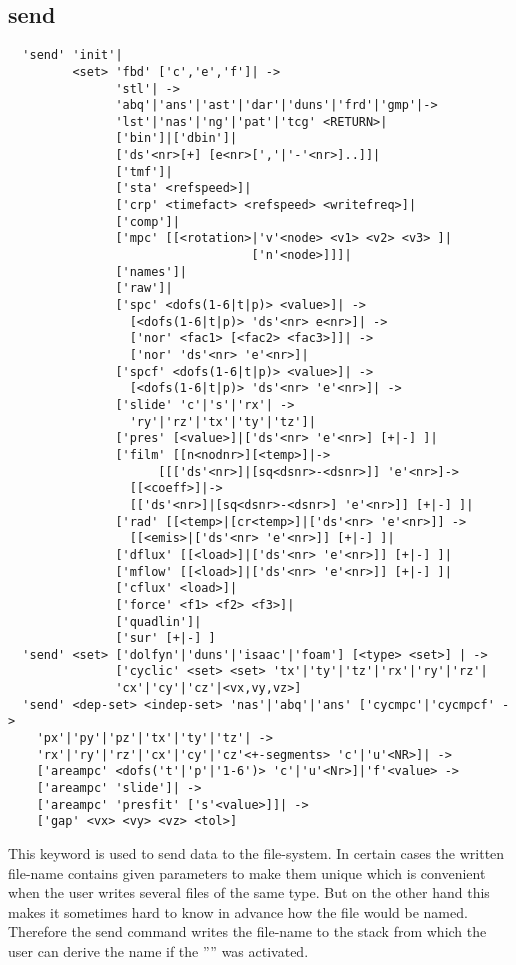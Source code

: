 \documentclass{article}
\begin{document}
\subsection{\label{send}send}
\begin{verbatim}
  'send' 'init'|
         <set> 'fbd' ['c','e','f']| ->
               'stl'| ->
               'abq'|'ans'|'ast'|'dar'|'duns'|'frd'|'gmp'|->
               'lst'|'nas'|'ng'|'pat'|'tcg' <RETURN>|
               ['bin']|['dbin']|
               ['ds'<nr>[+] [e<nr>[','|'-'<nr>]..]]|
               ['tmf']|
               ['sta' <refspeed>]|
               ['crp' <timefact> <refspeed> <writefreq>]|
               ['comp']|
               ['mpc' [[<rotation>|'v'<node> <v1> <v2> <v3> ]|
                                  ['n'<node>]]]|
               ['names']|
               ['raw']|
               ['spc' <dofs(1-6|t|p)> <value>]| ->
                 [<dofs(1-6|t|p)> 'ds'<nr> e<nr>]| ->
                 ['nor' <fac1> [<fac2> <fac3>]]| ->
                 ['nor' 'ds'<nr> 'e'<nr>]|
               ['spcf' <dofs(1-6|t|p)> <value>]| ->
                 [<dofs(1-6|t|p)> 'ds'<nr> 'e'<nr>]| ->
               ['slide' 'c'|'s'|'rx'| ->
                 'ry'|'rz'|'tx'|'ty'|'tz']|
               ['pres' [<value>]|['ds'<nr> 'e'<nr>] [+|-] ]|
               ['film' [[n<nodnr>][<temp>]|->
                     [[['ds'<nr>]|[sq<dsnr>-<dsnr>]] 'e'<nr>]->
                 [[<coeff>]|->
                 [['ds'<nr>]|[sq<dsnr>-<dsnr>] 'e'<nr>]] [+|-] ]| 
               ['rad' [[<temp>|[cr<temp>]|['ds'<nr> 'e'<nr>]] ->
                 [[<emis>|['ds'<nr> 'e'<nr>]] [+|-] ]|
               ['dflux' [[<load>]|['ds'<nr> 'e'<nr>]] [+|-] ]|
               ['mflow' [[<load>]|['ds'<nr> 'e'<nr>]] [+|-] ]|
               ['cflux' <load>]| 
               ['force' <f1> <f2> <f3>]|
               ['quadlin']|
               ['sur' [+|-] ]
  'send' <set> ['dolfyn'|'duns'|'isaac'|'foam'] [<type> <set>] | ->
               ['cyclic' <set> <set> 'tx'|'ty'|'tz'|'rx'|'ry'|'rz'|
               'cx'|'cy'|'cz'|<vx,vy,vz>] 
  'send' <dep-set> <indep-set> 'nas'|'abq'|'ans' ['cycmpc'|'cycmpcf' ->
    'px'|'py'|'pz'|'tx'|'ty'|'tz'| ->
    'rx'|'ry'|'rz'|'cx'|'cy'|'cz'<+-segments> 'c'|'u'<NR>]| ->
    ['areampc' <dofs('t'|'p'|'1-6')> 'c'|'u'<Nr>]|'f'<value> ->
    ['areampc' 'slide']| ->
    ['areampc' 'presfit' ['s'<value>]]| ->
    ['gap' <vx> <vy> <vz> <tol>] 
\end{verbatim}
This keyword is used to send data to the file-system. In certain cases the written file-name contains given parameters to make them unique which is convenient when the user writes several files of the same type. But on the other hand this makes it sometimes hard to know in advance how the file would be named. Therefore the send command writes the file-name to the stack from which the user can derive the name if the '''' was activated.
\end{document}

